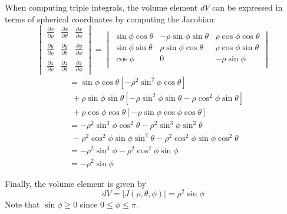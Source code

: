 \documentclass[handout]{ximera}
\begin{document}
When computing triple integrals, the volume element $dV$ can be expressed in terms of spherical coordinates by computing the Jacobian:
\[
\begin{vmatrix}
\frac{\partial x}{\partial \rho} & \frac{\partial x}{\partial \theta} &\frac{\partial x}{\partial \phi}\\[10pt]
\frac{\partial y}{\partial \rho} & \frac{\partial y}{\partial \theta} &\frac{\partial y}{\partial \phi}\\[10pt]
\frac{\partial z}{\partial \rho} & \frac{\partial z}{\partial \theta} &\frac{\partial z}{\partial \phi}
\end{vmatrix}
= 
\begin{vmatrix}
\sin \phi \cos \theta& -\rho \sin \phi \sin \theta &\rho \cos \phi \cos \theta\\ 
\sin \phi \sin \theta& \rho \sin \phi \cos\theta &\rho \cos \phi \sin \theta\\ 
 \cos \phi & 0 &-\rho \sin \phi\\
\end{vmatrix}
\]
\begin{align*}
&= \sin \phi \cos \theta \left[-\rho^2 \sin^2\phi\cos\theta \right]\\
 &\;+\rho \sin \phi \sin \theta\left[-\rho\sin^2\phi\sin\theta- \rho\cos^2\phi\sin\theta\right]\\
 & \;+ \rho \cos \phi \cos \theta \left[-\rho \sin\phi\cos\phi\cos\theta\right]\\
 &= -\rho^2 \sin^3\phi \cos^2\theta -\rho^2 \sin^3\phi \sin^2\theta \\
 & \; - \rho^2 \cos^2\phi \sin\phi \sin^2\theta - \rho^2 \cos^2\phi \sin\phi \cos^2\theta\\
  &= -\rho^2\sin^3\phi - \rho^2\cos^2\phi\sin\phi\\
 &=-\rho^2 \sin \phi
\end{align*}
 
Finally, the volume element is given by
\[
dV = |J(\rho, \theta, \phi)| = \rho^2 \sin \phi
\]
Note that $\sin \phi \geq 0$ since $0 \leq \phi \leq \pi$.
\end{document}
